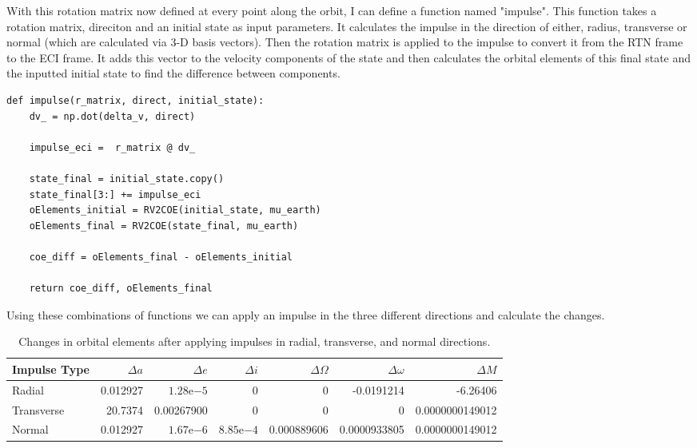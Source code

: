 \documentclass[a4paper, 12pt]{article}  %
\begin{document}
With this rotation matrix now defined at every point along the orbit, I can define a function named "impulse". This function
takes a rotation matrix, direciton and an initial state as input parameters. It calculates the impulse in the direction of either, 
radius, transverse or normal (which are calculated via 3-D basis vectors). Then the rotation matrix is applied to the impulse to convert
it from the RTN frame to the ECI frame. It adds this vector to the velocity components of the state and then calculates the orbital 
elements of this final state and the inputted initial state to find the difference between components. 
\begin{lstlisting}
def impulse(r_matrix, direct, initial_state):
    dv_ = np.dot(delta_v, direct)

    impulse_eci =  r_matrix @ dv_

    state_final = initial_state.copy()
    state_final[3:] += impulse_eci
    oElements_initial = RV2COE(initial_state, mu_earth)
    oElements_final = RV2COE(state_final, mu_earth)

    coe_diff = oElements_final - oElements_initial

    return coe_diff, oElements_final
\end{lstlisting}

Using these combinations of functions we can apply an impulse in the three different directions and calculate the changes.
\begin{table}[h]
    \centering
    \small
    \setlength{\tabcolsep}{4pt}
    \renewcommand{\arraystretch}{1.1}
    \begin{tabular}{lrrrrrr}
    \hline
    Impulse Type & $\Delta a$ & $\Delta e$ & $\Delta i$ & $\Delta \Omega$ & $\Delta \omega$ & $\Delta M$ \\
    \hline
    Radial     & 0.012927 & $1.28\mathrm{e}{-5}$ & 0 & 0 & -0.0191214 & -6.26406 \\
    Transverse & 20.7374  & 0.00267900   & 0 & 0 & 0 & 0.0000000149012 \\
    Normal     & 0.012927 & $1.67\mathrm{e}{-6}$ & $8.85\mathrm{e}{-4}$ & 0.000889606 & 0.0000933805 & 0.0000000149012 \\
    \hline
    \end{tabular}
    \caption{Changes in orbital elements after applying impulses in radial, transverse, and normal directions.}
    \label{tab:orbital_changes}
    \end{table}
    
\end{document}
